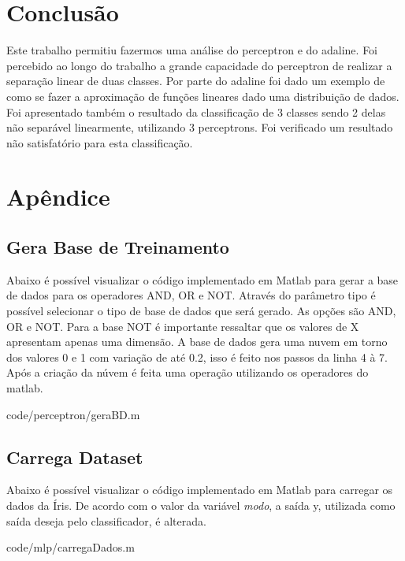 \documentclass[12pt,journal,onecolumn]{IEEEtran}
\begin{document}
\section{Conclusão}
Este trabalho permitiu fazermos uma análise do perceptron e do adaline. Foi
percebido ao longo do trabalho a grande capacidade do perceptron de realizar a
separação linear de duas classes. Por parte do adaline foi dado um exemplo de
como se fazer a aproximação de funções lineares dado uma distribuição de dados.
Foi apresentado também o resultado da classificação de 3 classes sendo 2 delas
não separável linearmente, utilizando 3 perceptrons. Foi verificado um resultado
não satisfatório para esta classificação.
\afterpage
\onecolumn




\section{Apêndice}

\subsection{Gera Base de Treinamento}
\label{subsec:geraBase}
Abaixo é possível visualizar o código implementado em Matlab para gerar a base
de dados para os operadores AND, OR e NOT. 
Através do parâmetro tipo é possível selecionar o tipo de base de dados que será
gerado. As opções são AND, OR e NOT. Para a base NOT é importante ressaltar que
os valores de X apresentam apenas uma dimensão.
A base de dados gera uma nuvem em torno dos valores 0 e 1 com variação de até
0.2, isso é feito nos passos da linha 4 à 7. Após a criação da núvem é feita uma
operação utilizando os operadores do matlab.


{code/perceptron/geraBD.m}

\subsection{Carrega Dataset} 
\label{subsec:carregaDataset}
Abaixo é possível visualizar o código implementado em Matlab para carregar os
dados da Íris. De acordo com o valor da variável \textit{modo}, a saída y, utilizada
como saída deseja pelo classificador, é alterada.

{code/mlp/carregaDados.m}
\end{document}
